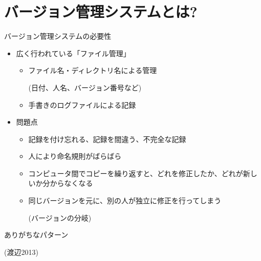 \section{バージョン管理システムとは?}

\begin{frame}[t,fragile]{バージョン管理システムの必要性}
  \begin{itemize}
    \setlength{\itemsep}{1em}
  \item 広く行われている「ファイル管理」
    \begin{itemize}
    \item ファイル名・ディレクトリ名による管理

      (日付、人名、バージョン番号など)
    \item 手書きのログファイルによる記録
    \end{itemize}
  \item 問題点
    \begin{itemize}
    \item 記録を付け忘れる、記録を間違う、不完全な記録
    \item 人により命名規則がばらばら
    \item コンピュータ間でコピーを繰り返すと、どれを修正したか、どれが新しいか分からなくなる
    \item 同じバージョンを元に、別の人が独立に修正を行ってしまう

      (バージョンの分岐)
    \end{itemize}
  \end{itemize}
\end{frame}

\begin{frame}[t,fragile]{ありがちなパターン}
  \vspace*{-1.8em}
  \begin{center}
  \end{center}
  \vspace*{-2em}
  {\footnotesize (渡辺2013)}
\end{frame}

